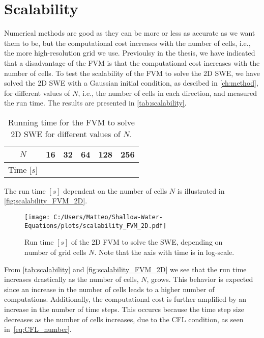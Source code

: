 \section{Scalability}\label{sec:scalability}
Numerical methods are good as they can be more or less as accurate as we want them to be, but the computational cost increases with the number of cells, i.e., the more high-resolution grid we use.
Previoulsy in the thesis, we have indicated that a disadvantage of the FVM is that the computational cost increases with the number of cells.
To test the scalability of the FVM to solve the 2D SWE, we have solved the 2D SWE with a Gaussian initial condition, as descibed in \autoref{ch:method}, for different values of $N$, i.e., the number of cells in each direction, and measured the run time.
The results are presented in \autoref{tab:scalability}.
\begin{table}[H]
    \centering
    \begin{tabular}{c|ccccc}
        \hline
        $N$ & 16 & 32 & 64 & 128 & 256 \\
        \hline 
        Time [$s$] & 
         &
         &
         &
         &
        
        \\
        \hline
    \end{tabular}
    \caption{Running time for the FVM to solve 2D SWE for different values of $N$.}\label{tab:scalability}
\end{table}
The run time $[s]$ dependent on the number of cells $N$ is illustrated in \autoref{fig:scalability_FVM_2D}.
\begin{figure}[H]
    \centering
    \texttt{[image: C:/Users/Matteo/Shallow-Water-Equations/plots/scalability\_FVM\_2D.pdf]}
    \caption{Run time $[s]$ of the 2D FVM to solve the SWE, depending on number of grid cells $N$.
            Note that the axis with time is in log-scale.}\label{fig:scalability_FVM_2D}
\end{figure}
From \autoref{tab:scalability} and \autoref{fig:scalability_FVM_2D} we see that the run time increases drastically as the number of cells, $N$, grows.
This behavior is expected since an increase in the number of cells leads to a higher number of computations.
Additionally, the computational cost is further amplified by an increase in the number of time steps.
This occurcs because the time step size decreases as the number of cells increases, due to the CFL condition, as seen in~\eqref{eq:CFL_number}.

